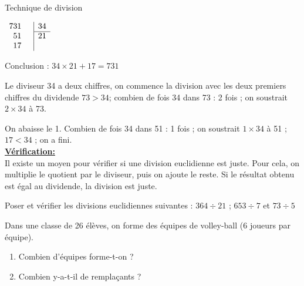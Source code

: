 \begin{mymethname}{Technique de division}
\begin{multicols}{2}
	\begin{center}
		$\begin{array}{rc|c}
		731 & & 34 \\
		\cline{3-3}
		51& & 21 \\
		17 & & \\
		\end{array}$
	\end{center}

Conclusion : $34 \times 21 + 17 = 731$
\end{multicols}


Le diviseur 34 a deux chiffres, on commence la division avec les deux premiers chiffres du dividende $73 > 34 $; 
combien de fois 34 dans 73 : 2 fois ; on soustrait $2 \times 34$ à 73.

On abaisse le 1. 
Combien de fois 34 dans 51 : 1 fois ; 
on soustrait $1 \times 34$ à 51 ; $17 < 34$ ; on a fini.\\


\textbf{\underline{Vérification:}}\\
Il existe un moyen pour vérifier si une division euclidienne est juste. 
Pour cela, on multiplie le quotient par le diviseur, puis on ajoute le reste. 
Si le résultat obtenu est égal au dividende, la division est juste.
\end{mymethname}


\begin{myexs}
	Poser et vérifier les divisions euclidiennes suivantes : $364 \div 21$ ; $653 \div 7$ et $73 \div 5$
	
	\vspace*{4cm} 
\end{myexs}

\begin{mypb}
	Dans une classe de 26 élèves, on forme des équipes de volley-ball (6 joueurs par équipe).
	
	\begin{enumerate}
		\item Combien d’équipes forme-t-on ?
		\item Combien y-a-t-il de remplaçants ?	
	\end{enumerate}

\vspace*{4cm} 	
\end{mypb}